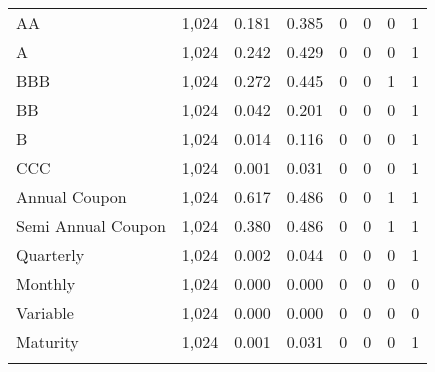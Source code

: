 \begin{table}[!htbp]
\begin{tabular}{@{\extracolsep{5pt}}lccccccc}
AA & 1,024 & 0.181 & 0.385 & 0 & 0 & 0 & 1 \\ 
A & 1,024 & 0.242 & 0.429 & 0 & 0 & 0 & 1 \\ 
BBB & 1,024 & 0.272 & 0.445 & 0 & 0 & 1 & 1 \\ 
BB & 1,024 & 0.042 & 0.201 & 0 & 0 & 0 & 1 \\ 
B & 1,024 & 0.014 & 0.116 & 0 & 0 & 0 & 1 \\ 
CCC & 1,024 & 0.001 & 0.031 & 0 & 0 & 0 & 1 \\ 
Annual Coupon & 1,024 & 0.617 & 0.486 & 0 & 0 & 1 & 1 \\ 
Semi Annual Coupon & 1,024 & 0.380 & 0.486 & 0 & 0 & 1 & 1 \\ 
Quarterly & 1,024 & 0.002 & 0.044 & 0 & 0 & 0 & 1 \\ 
Monthly & 1,024 & 0.000 & 0.000 & 0 & 0 & 0 & 0 \\ 
Variable & 1,024 & 0.000 & 0.000 & 0 & 0 & 0 & 0 \\ 
Maturity & 1,024 & 0.001 & 0.031 & 0 & 0 & 0 & 1 \\ 
\hline \\[-1.8ex] 
\end{tabular} 
\end{table}

